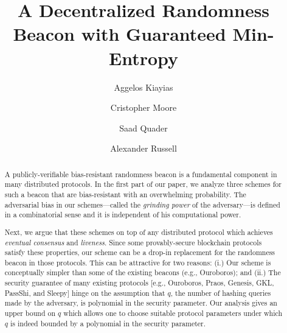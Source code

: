 \documentclass{article}
\title{%
  A Decentralized Randomness Beacon with Guaranteed Min-Entropy}
\author[1,4]{Aggelos Kiayias}
\author[2]{Cristopher Moore}
\author[3]{Saad Quader}
\author[3,4]{Alexander Russell}
\affil[1]{University of Edinburgh}
\affil[2]{Santa Fe Institute}
\affil[3]{University of Connecticut}
\affil[4]{IOHK}
\begin{document}
\maketitle

\begin{abstract}
  A publicly-verifiable bias-resistant randomness beacon is a fundamental component in many distributed protocols.
  In the first part of our paper, we analyze three schemes for such a beacon that are
  bias-resistant with an overwhelming probability. 
  The adversarial bias in our schemes---called the \emph{grinding power} of the adversary---is 
  defined in a combinatorial sense and it is independent of his computational power. 
  
  Next, we argue that these schemes on top of any distributed protocol which achieves
  \emph{eventual consensus} and \emph{liveness}. 
  Since some provably-secure blockchain protocols satisfy these properties, our scheme can 
  be a drop-in replacement for the randomness beacon in those protocols. 
  This can be attractive for two reasons: 
  (i.) Our scheme is conceptually simpler than some 
  of the existing beacons (e.g., Ouroboros); and 
  (ii.) The security guarantee of many existing protocols [e.g., Ouroboros, Praos, Genesis, GKL, PassShi, and Sleepy] 
  hinge on the assumption 
  that $q$, the number of hashing queries made by the adversary, is polynomial in the security parameter. 
  Our analysis gives an upper bound on $q$ which allows one to choose suitable protocol parameters 
  under which $q$ is indeed bounded by a polynomial in the security parameter.
  
\end{abstract}


\end{document}
